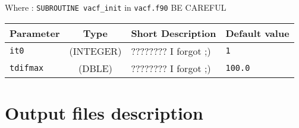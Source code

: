 \documentclass[a4paper]{article}
\begin{document}
Where : \verb?SUBROUTINE vacf_init? in \verb?vacf.f90?
BE CAREFUL
\newline

\begin{longtable}{l|c|m{8cm}|m{2cm}}
\hline
\hline
Parameter        &  Type              &          Short Description                                                          & Default value \\
\hline
\hline
\rule[-0.75cm]{0cm}{1.5cm}
\verb?it0?       & (INTEGER)          & ???????? I forgot ;)                                                                & \verb?1? \\
\hline
\rule[-0.75cm]{0cm}{1.5cm}
\verb?tdifmax?   & (DBLE)             & ???????? I forgot ;)                                                                & \verb?100.0? \\ 
\hline
\hline
\end{longtable}


\section{Output files description}



\end{document}
